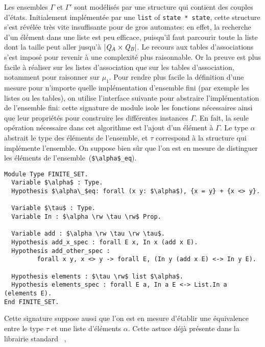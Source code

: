 Les ensembles $\Gamma$ et $\Gamma'$ sont modélisés par une structure
qui contient des couples d'états. Initialement implémentée par une \lstinline!list! of \lstinline!state * state!,
cette structure s'est révélée très vite insuffisante pour de gros automates: en effet, la recherche d'un élément
dans une liste est peu efficace, puisqu'il faut parcourir toute la liste dont la taille peut aller jusqu'à $|\mathit Q_\mathit A \times \mathit Q_\mathit B|$.
Le recours aux tables d'associations s'est imposé pour revenir à une complexité plus raisonnable.
Or la preuve est plus facile à réaliser sur les listes d'association que sur les tables d'association,
notamment pour raisonner sur $\mu_1$.
Pour rendre plus facile la définition d'une mesure pour n'importe quelle implémentation d'ensemble fini
(par exemple les listes ou les tables), on utilise l'interface suivante pour abstraire l'implémentation 
de l'ensemble fini: cette signature de module isole les fonctions nécessaires ainsi que leur propriétés pour construire
les différentes instances $\Gamma$. En fait, la seule opération nécessaire dans cet algorithme est l'ajout d'un élément à $\Gamma$.
Le type $\alpha$ abstrait le type des éléments de l'ensemble, et $\tau$ correspond à la structure qui implémente l'ensemble.
On suppose bien sûr que l'on est en mesure de distinguer les éléments de l'ensemble~(\lstinline!$\alpha$_eq!).
\begin{lstlisting}
Module Type FINITE_SET.
  Variable $\alpha$ : Type.
  Hypothesis $\alpha\_$eq: forall (x y: $\alpha$), {x = y} + {x <> y}.
  
  Variable $\tau$ : Type.
  Variable In : $\alpha \rw \tau \rw$ Prop.
  
  Variable add : $\alpha \rw \tau \rw \tau$.
  Hypothesis add_x_spec : forall E x, In x (add x E).
  Hypothesis add_other_spec :
         forall x y, x <> y -> forall E, (In y (add x E) <-> In y E).

  Hypothesis elements : $\tau \rw$ list $\alpha$.
  Hypothesis elements_spec : forall E a, In a E <-> List.In a (elements E).
End FINITE_SET.
\end{lstlisting}
Cette signature suppose aussi que l'on est en mesure d'établir une équivalence entre le type $\tau$ et une
liste d'éléments $\alpha$. Cette astuce déjà présente dans la librairie standard \coq~\cite{coq-stdlib}, 
